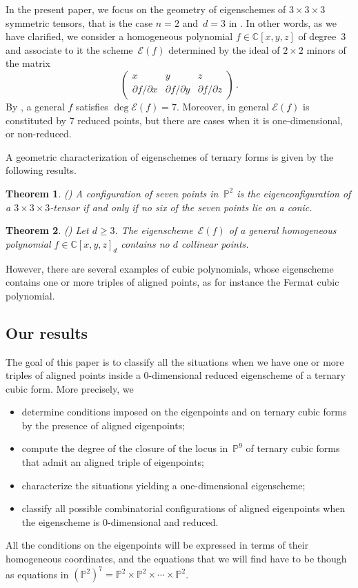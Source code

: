 \documentclass[a4paper, 11pt, reqno]{amsart}
\theoremstyle{plain}
\newtheorem{theoremintro}{Theorem}
\theoremstyle{definition}
\newcommand{\C}{\mathbb{C}}
\newcommand{\p}{\mathbb{P}}
\newcommand{\Eig}[1]{\mathcal{E}\!\left( {#1} \right)}
\begin{document}
In the present paper, we focus on the geometry of eigenschemes of $3\times 3 \times 3$ symmetric tensors, 
that is the case $n=2$ and~$d=3$ in .
In other words, as we have clarified, we consider a homogeneous polynomial $f \in \C[x, y, z]$ of degree~$3$ and associate to it the scheme~$\Eig{f}$ determined by the ideal of $2 \times 2$ minors of the matrix
%
\[
\begin{pmatrix}
    x & y & z \\
    \partial f / \partial x & \partial f / \partial y & \partial f / \partial z
\end{pmatrix} \,.
\]
%
By , a general $f$ satisfies $\deg \Eig{f}=7$.
Moreover, in general $\Eig{f}$ is constituted by $7$ reduced points, but there are cases when it is one-dimensional, or non-reduced. 

A geometric characterization of eigenschemes of ternary forms is given by the following results.

\begin{theoremintro}(\cite[Theorem 5.1]{ASS})
\label{thm:no_six_conics}
A configuration of seven points in~$\p^2$ is the eigenconfiguration
of a $3 \times 3 \times 3$-tensor if and only if no six of the seven points lie on a conic.
\end{theoremintro}

\begin{theoremintro}(\cite[Theorem 5.7]{BGV})
\label{thm:general_no_d_collinear}
Let $d \ge 3$. The eigenscheme~$\Eig{f}$ of a general homogeneous polynomial $f \in \C[x, y, z]_d$ contains no $d$ collinear points.
\end{theoremintro}

However, there are several examples of cubic polynomials, whose eigenscheme contains one or more triples of aligned points, as for instance the Fermat cubic polynomial.

\subsection*{Our results}
The goal of this paper is to classify all the situations when we have one or more triples of aligned points inside a $0$-dimensional reduced eigenscheme of a ternary cubic form.
More precisely, we
%
\begin{itemize}
    \item determine conditions imposed on the eigenpoints and on ternary cubic forms by the presence of aligned eigenpoints;
    \item compute the degree of the closure of the locus in~$\p^9$ of ternary cubic forms that admit an aligned triple of eigenpoints;
    \item characterize the situations yielding a one-dimensional eigenscheme;
    \item classify all possible combinatorial configurations of aligned eigenpoints when the eigenscheme is $0$-dimensional and reduced.
\end{itemize}
%
All the conditions on the eigenpoints will be expressed in terms of their homogeneous coordinates, and the equations that we will find have to be though as equations in $(\p^2)^7=\p^2 \times \p^2 \times \dotsb \times \p^2$.
\end{document}
